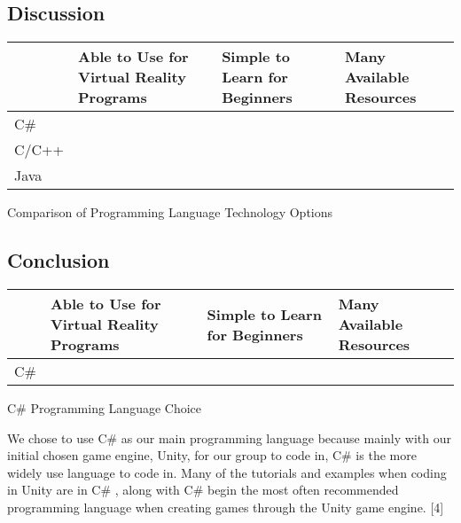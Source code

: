 \documentclass[letterpaper,10pt,onecolumn,compsoc]{IEEEtran}
\begin{document}
\newpage

\subsection{Discussion}

\begin{center}
\begin{tabular}{ | P{2.5cm} | P{3.5cm} | P{2.75cm} | P{3cm} | } 
 	\hline
 	 & Able to Use for Virtual Reality Programs & Simple to Learn for Beginners & Many Available Resources \\ 
 	\hline 		
 	C\# & \checkmark & \checkmark & \checkmark \\ 
 	\hline
 	C/C++ & \checkmark & & \checkmark \\ 
 	\hline
 	Java & \checkmark & & \checkmark \\ 
 	\hline
\end{tabular}
\end{center}

\begin{center}
Comparison of Programming Language Technology Options
\end{center}

\subsection{Conclusion}

\begin{center}
\begin{tabular}{ | P{2.5cm} | P{3.5cm} | P{2.75cm} | P{3cm} | } 
 	\hline
 	 & Able to Use for Virtual Reality Programs & Simple to Learn for Beginners & Many Available Resources \\ 
 	\hline 		
 	C\# & \checkmark & \checkmark & \checkmark \\ 
 	\hline
\end{tabular}
\end{center}

\begin{center}
C\# Programming Language Choice
\end{center}

\noindent
We chose to use C\# as our main programming language because mainly with our initial chosen game engine, Unity, for our group to code in, C\# is the more widely use language to code in. Many of the tutorials and examples when coding in Unity are in C\# , along with C\# begin the most often recommended programming language when creating games through the Unity game engine. [4]
\end{document}
